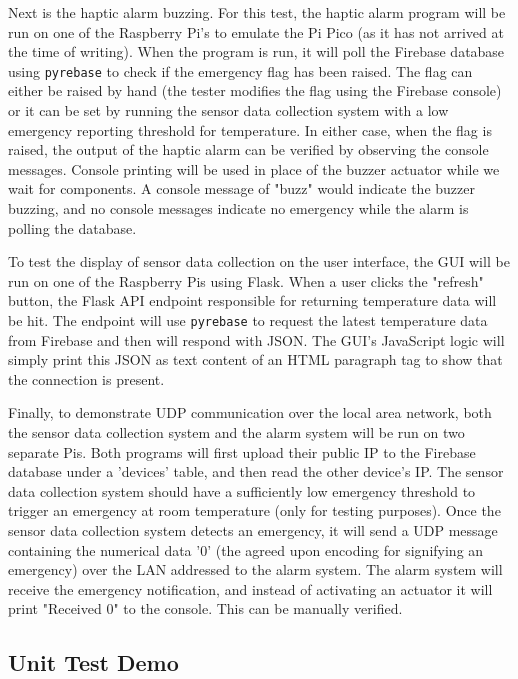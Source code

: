 Next is the haptic alarm buzzing. For this test, the haptic alarm program will be run on one of the Raspberry Pi's to
emulate the Pi Pico (as it has not arrived at the time of writing). When the program is run, it will poll the Firebase
database using \texttt{pyrebase} to check if the emergency flag has been raised. The flag can either be raised by hand
(the tester modifies the flag using the Firebase console) or it can be set by running the sensor data collection system
with a low emergency reporting threshold for temperature. In either case, when the flag is raised, the output of the
haptic alarm can be verified by observing the console messages. Console printing will be used in place of the buzzer
actuator while we wait for components. A console message of "buzz" would indicate the buzzer buzzing, and no console
messages indicate no emergency while the alarm is polling the database.

To test the display of sensor data collection on the user interface, the GUI will be run on one of the Raspberry Pis
using Flask. When a user clicks the "refresh" button, the Flask API endpoint responsible for returning temperature data
will be hit. The endpoint will use \texttt{pyrebase} to request the latest temperature data from Firebase and then will
respond with JSON. The GUI's JavaScript logic will simply print this JSON as text content of an HTML paragraph tag to
show that the connection is present.

Finally, to demonstrate UDP communication over the local area network, both the sensor data collection system and the
alarm system will be run on two separate Pis. Both programs will first upload their public IP to the Firebase database
under a 'devices' table, and then read the other device's IP. The sensor data collection system should have a
sufficiently low emergency threshold to trigger an emergency at room temperature (only for testing purposes). Once the
sensor data collection system detects an emergency, it will send a UDP message containing the numerical data '0' (the
agreed upon encoding for signifying an emergency) over the LAN addressed to the alarm system. The alarm system will
receive the emergency notification, and instead of activating an actuator it will print "Received 0" to the console.
This can be manually verified.

\subsection{Unit Test Demo}

